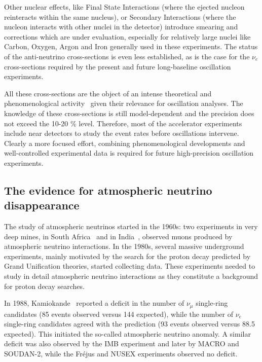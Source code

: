 Other nuclear effects, like Final State Interactions (where the ejected nucleon reinteracts within the same nucleus), or Secondary Interactions (where the nucleon interacts with other nuclei in the detector) introduce smearing and corrections which are under evaluation, especially for relatively large nuclei like Carbon, Oxygen, Argon and Iron generally used in these experiments. 
The status of the anti-neutrino cross-sections is even less established, as is the case for the $\nu_e$ cross-sections required by the present and future long-baseline oscillation experiments.  

All these cross-sections are the object of an intense theoretical and phenomenological activity~\cite{zeller,martini} given their relevance for oscillation analyses. The knowledge of these cross-sections is still model-dependent and the precision does not exceed the 10-20 \% level. Therefore, most of the accelerator experiments include near detectors to study the event rates before oscillations intervene. Clearly a more focused effort, combining phenomenological developments and well-controlled experimental data is required for future high-precision oscillation experiments.


\subsection{The evidence for atmospheric neutrino disappearance}
\label{subsec:atmevidence}

The study of atmospheric neutrinos started in the 1960s: two experiments in very deep mines, in South Africa~\cite{Reines:1965qk} and in India~\cite{Achar:1965ova}, observed muons produced by atmospheric neutrino interactions. 
In the 1980s, several massive underground experiments, mainly motivated by the search for the proton decay predicted by Grand Unification theories, started collecting data. These experiments needed to study in detail atmospheric neutrino interactions as they constitute a background for proton decay searches.

In 1988, Kamiokande~\cite{kam88} reported a deficit in the number of $\nu_\mu$ single-ring candidates (85 events observed versus 144 expected), while the number of $\nu_e$ single-ring candidates agreed with the prediction (93 events observed versus 88.5 expected). 
This initiated the so-called atmospheric neutrino anomaly. A similar deficit was also observed by the IMB experiment and later by MACRO and SOUDAN-2, while the Fr\'ejus and NUSEX experiments observed no deficit. 

